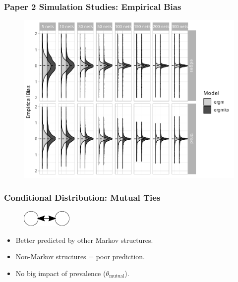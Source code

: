 \documentclass[aspectratio=169, 9pt]{beamer}
\begin{document}
\begin{frame}[label=ergmito-bias]
\frametitle{Paper 2 Simulation Studies: Empirical Bias}

\begin{figure}
\centering
\includegraphics[width=.6\linewidth]{bias-02-various-sizes-4-5-ttriad.pdf}
\end{figure}


\end{frame}

\begin{frame}[c,label=conditional-mutuals]
	\frametitle{Conditional Distribution: Mutual Ties}
	\begin{minipage}[b]{.28\linewidth}
		\begin{figure}
			\includegraphics[width=.3\linewidth]{mutual.pdf}
		\end{figure}
		
		\begin{itemize}[<+->]
			\item Better predicted by other Markov structures.
			\item Non-Markov structures = poor prediction.
			\item No big impact of prevalence ($\theta_{\mbox{mutual}}$).
		\end{itemize}
	\end{minipage}
	\begin{minipage}[b]{.7\linewidth}
		\begin{figure}
			\centering
			\def\svgwidth{.95\linewidth}
		\end{figure}
	\end{minipage}
	\vfill\hfill
	\hyperlink{conditional-transitivity}{}
\end{frame}
\end{document}
